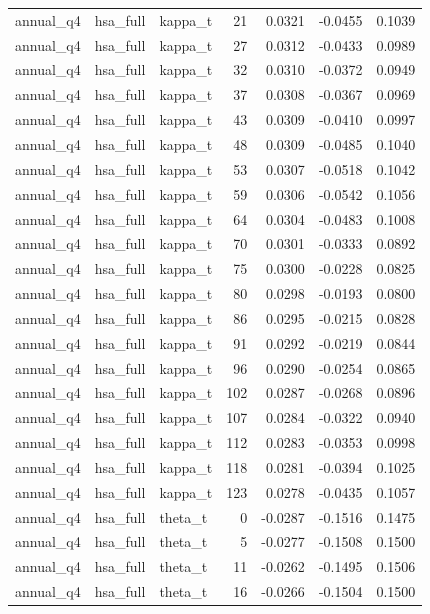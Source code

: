 \begin{tabular}{lllrrrr}
annual\_q4 & hsa\_full & kappa\_t & 21 & 0.0321 & -0.0455 & 0.1039 \\
annual\_q4 & hsa\_full & kappa\_t & 27 & 0.0312 & -0.0433 & 0.0989 \\
annual\_q4 & hsa\_full & kappa\_t & 32 & 0.0310 & -0.0372 & 0.0949 \\
annual\_q4 & hsa\_full & kappa\_t & 37 & 0.0308 & -0.0367 & 0.0969 \\
annual\_q4 & hsa\_full & kappa\_t & 43 & 0.0309 & -0.0410 & 0.0997 \\
annual\_q4 & hsa\_full & kappa\_t & 48 & 0.0309 & -0.0485 & 0.1040 \\
annual\_q4 & hsa\_full & kappa\_t & 53 & 0.0307 & -0.0518 & 0.1042 \\
annual\_q4 & hsa\_full & kappa\_t & 59 & 0.0306 & -0.0542 & 0.1056 \\
annual\_q4 & hsa\_full & kappa\_t & 64 & 0.0304 & -0.0483 & 0.1008 \\
annual\_q4 & hsa\_full & kappa\_t & 70 & 0.0301 & -0.0333 & 0.0892 \\
annual\_q4 & hsa\_full & kappa\_t & 75 & 0.0300 & -0.0228 & 0.0825 \\
annual\_q4 & hsa\_full & kappa\_t & 80 & 0.0298 & -0.0193 & 0.0800 \\
annual\_q4 & hsa\_full & kappa\_t & 86 & 0.0295 & -0.0215 & 0.0828 \\
annual\_q4 & hsa\_full & kappa\_t & 91 & 0.0292 & -0.0219 & 0.0844 \\
annual\_q4 & hsa\_full & kappa\_t & 96 & 0.0290 & -0.0254 & 0.0865 \\
annual\_q4 & hsa\_full & kappa\_t & 102 & 0.0287 & -0.0268 & 0.0896 \\
annual\_q4 & hsa\_full & kappa\_t & 107 & 0.0284 & -0.0322 & 0.0940 \\
annual\_q4 & hsa\_full & kappa\_t & 112 & 0.0283 & -0.0353 & 0.0998 \\
annual\_q4 & hsa\_full & kappa\_t & 118 & 0.0281 & -0.0394 & 0.1025 \\
annual\_q4 & hsa\_full & kappa\_t & 123 & 0.0278 & -0.0435 & 0.1057 \\
annual\_q4 & hsa\_full & theta\_t & 0 & -0.0287 & -0.1516 & 0.1475 \\
annual\_q4 & hsa\_full & theta\_t & 5 & -0.0277 & -0.1508 & 0.1500 \\
annual\_q4 & hsa\_full & theta\_t & 11 & -0.0262 & -0.1495 & 0.1506 \\
annual\_q4 & hsa\_full & theta\_t & 16 & -0.0266 & -0.1504 & 0.1500 \\

\end{tabular}
